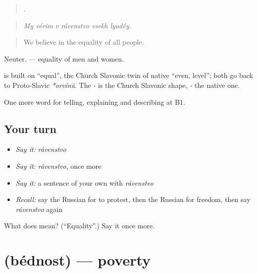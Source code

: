 \begin{quote}
     .
\end{quote}

\begin{quote}
\emph{My vérim v rávenstvo vsekh lyudéy.}
\end{quote}

\begin{quote}
We believe in the equality of all people.
\end{quote}

Neuter. \emph{   } — equality of men and women.

\begin{cousinweb}
\textbf{} is built on \emph{} \textquotedblleft{}equal\textquotedblright{}, the Church Slavonic twin of native \emph{} \textquotedblleft{}even, level\textquotedblright{}; both go back to Proto-Slavic \emph{*orvĭnŭ}. The \emph{-} is the Church Slavonic shape, \emph{-} the native one.
\end{cousinweb}

\begin{grammarlens}[title={What you've built}]
One more word for telling, explaining and describing at B1.
\end{grammarlens}

\subsection*{Your turn}
\begin{itemize}
\raggedright
  \item \emph{Say it:} \emph{rávenstvo}
  \item \emph{Say it:} \emph{rávenstvo}, once more
  \item \emph{Say it:} a sentence of your own with \emph{rávenstvo}
  \item \emph{Recall:} say the Russian for to protest, then the Russian for freedom, then say \emph{rávenstvo} again
\end{itemize}

\begin{tcolorbox}[breakable,colback=teal!4,colframe=teal!35!black,title={Before you move on}]
What does  mean? (\textquotedblleft{}Equality\textquotedblright{}.) Say it once more.
\end{tcolorbox}
\section[\texorpdfstring{\ru{бедность} (bédnost)}{бедность (bédnost)}]{ (bédnost) — poverty}

